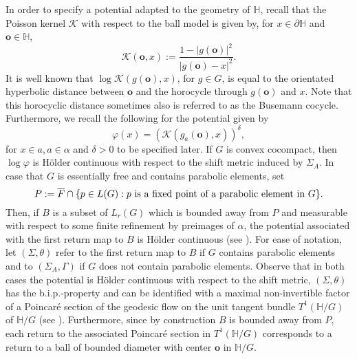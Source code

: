 \documentclass[10pt]{article}
\theoremstyle{mystyle}
\renewcommand{\H}{\mathbb{H}}
\newcommand{\cK}{\mathcal{K}}
\newcommand{\te}{{\theta}}
\newcommand{\Sig}{{\Sigma}}
\newcommand{\1}{\mathbf{1}}
\newcommand{\with}{:}
\begin{document}
 In order to specify a potential adapted to the geometry of $\H$, recall that  the  Poisson kernel $\cK$ with respect to the ball model is given by, for $x\in \partial \H$ and $\mathbf{o} \in   \H$,
\[\cK(\mathbf{o},x):= \frac{1-|g(\mathbf{o})|^2}{|g(\mathbf{o})-x|^2}.\]
It is well known that $\log \cK(g(\mathbf{o}),x)$, for $g\in G$, is equal to the orientated hyperbolic distance between $\mathbf{o}$ and the horocycle through $g(\mathbf{o})$ and $x$. Note that this horocyclic distance sometimes also is referred to as the Busemann cocycle. 
%
Furthermore, we recall the following for the potential given by
 \begin{equation}\label{def:Kernel}\varphi(x) = (\mathcal{K}(g_a(\mathbf{o}),x))^\delta,
 \end{equation} 
for $x \in a, a \in \alpha$ and $\delta>0$  to be specified later. If $G$ is convex cocompact, then  $\log \varphi$ is Hölder continuous with respect to the shift metric induced by $\Sig_A$. In case that $G$ is essentially free and contains parabolic elements, set 
\[P:= \overline{F}\cap \{p \in L(G) \with p \hbox{ is a fixed point of a parabolic element in } G \}.\] 
Then, if $B$ is a subset of $L_r(G)$ which is bounded away from $P$ and measurable with respect to some finite refinement by preimages of $\alpha$, the potential associated with the first return map to $B$ is Hölder continuous (see \cite[Lemmata 3.3 \& 3.4]{KessebohmerStratmann:2004a}). For ease of notation, let $(\Sig,\te)$ refer to the first return map to $B$ if $G$ contains parabolic elements and to $(\Sig_A,\Gamma)$ if $G$ does not contain parabolic elements. Observe that in both cases the potential  is Hölder continuous with respect to the shift metric, $(\Sig,\te)$ has the b.i.p.-property and can be identified with a maximal non-invertible factor of a Poincaré section of the geodesic flow on the unit tangent bundle  $T^1(\mathbb{H}/G)$  of $\mathbb{H}/G$ (see \cite{StadlbauerStratmann:2005}). Furthermore, since by construction $B$ is bounded away from $P$, each return to the associated Poincaré section in  $T^1(\mathbb{H}/G)$ corresponds to a return to a ball of bounded diameter with center $\mathbf{o}$ in $\mathbb{H}/G$.  
\end{document}
